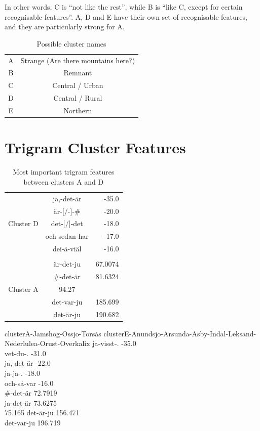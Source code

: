 In other words, C is ``not like the rest'', while B is ``like C,
except for certain recognisable features''. A, D and E have their own set
of recognisable features, and they are particularly strong for A.

\begin{table}
  \begin{tabular}{cc}
    A & Strange (Are there mountains here?) \\
    B & Remnant \\
    C & Central / Urban \\
    D & Central / Rural \\
    E & Northern \\
    \end{tabular}
    \label{cluster-names}
    \caption{Possible cluster names}
\end{table}

\section{Trigram Cluster Features}
\begin{table}
\begin{tabular}{rcr}
& ja,-det-\"ar & -35.0 \\
& \"ar-[/-]-\# & -20.0 \\
Cluster D & det-[/]-det & -18.0 \\
& och-sedan-har & -17.0 \\
& dei-\"a-vi\"al & -16.0 \\ \hline \\
& \"ar-det-ju & 67.0074 \\
& \#-det-\"ar & 81.6324 \\
 Cluster A & 94.27 & \\
& det-var-ju & 185.699 \\
& det-\"ar-ju & 190.682 \\
\end{tabular}
\label{trigram-feature-A-D}
\caption{Most important trigram features between clusters A and D}
\end{table}

clusterA-Jamshog-Ossjo-Tors\.as
clusterE-Anundsjo-Arsunda-Asby-Indal-Leksand-Nederlulea-Orust-Overkalix
ja-visst-. -35.0 \\
vet-du-. -31.0 \\
ja,-det-\"ar -22.0 \\
ja-ja-. -18.0 \\
och-s\.a-var -16.0 \\
\#-det-\"ar 72.7919 \\
ja-det-\"ar 73.6275 \\
 75.165
det-\"ar-ju 156.471 \\
det-var-ju 196.719 \\


